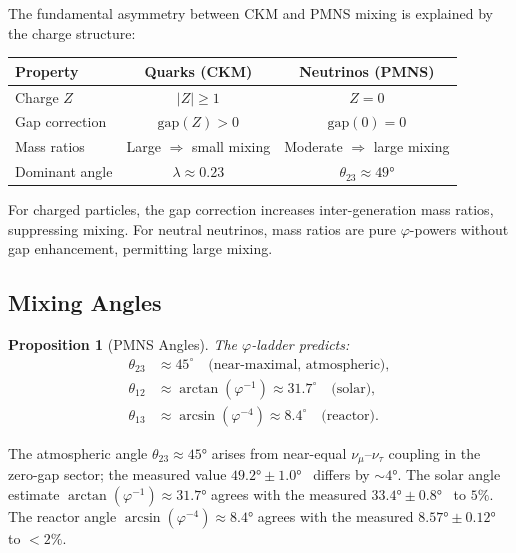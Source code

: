 \documentclass[12pt,a4paper]{article}
\newtheorem{proposition}[theorem]{Proposition}
\theoremstyle{definition}
\theoremstyle{remark}
\begin{document}
The fundamental asymmetry between CKM and PMNS mixing is explained by
the charge structure:

\begin{center}
\renewcommand{\arraystretch}{1.2}
\begin{tabular}{lcc}
\toprule
\textbf{Property} & \textbf{Quarks (CKM)} & \textbf{Neutrinos (PMNS)} \\
\midrule
Charge $Z$ & $|Z| \geq 1$ & $Z = 0$ \\
Gap correction & $\mathrm{gap}(Z) > 0$ & $\mathrm{gap}(0) = 0$ \\
Mass ratios & Large $\Rightarrow$ small mixing & Moderate $\Rightarrow$ large mixing \\
Dominant angle & $\lambda \approx 0.23$ & $\theta_{23} \approx 49°$ \\
\bottomrule
\end{tabular}
\end{center}

For charged particles, the gap correction increases inter-generation
mass ratios, suppressing mixing.  For neutral neutrinos, mass ratios
are pure $\varphi$-powers without gap enhancement, permitting large
mixing.

\subsection{Mixing Angles}

\begin{proposition}[PMNS Angles]
\label{prop:pmns-angles}
The $\varphi$-ladder predicts:
\begin{align}
  \theta_{23} &\approx 45^\circ \quad \text{(near-maximal, atmospheric)}, \\
  \theta_{12} &\approx \arctan(\varphi^{-1}) \approx 31.7^\circ
    \quad \text{(solar)}, \\
  \theta_{13} &\approx \arcsin(\varphi^{-4}) \approx 8.4^\circ
    \quad \text{(reactor)}.
\end{align}
\end{proposition}

The atmospheric angle $\theta_{23} \approx 45°$ arises from
near-equal $\nu_\mu$--$\nu_\tau$ coupling in the zero-gap sector;
the measured value $49.2° \pm 1.0°$~\cite{PDG2024} differs by $\sim 4°$.
The solar angle estimate $\arctan(\varphi^{-1}) \approx 31.7°$ agrees
with the measured $33.4° \pm 0.8°$~\cite{PDG2024} to $5\%$.  The reactor
angle $\arcsin(\varphi^{-4}) \approx 8.4°$ agrees with the measured
$8.57° \pm 0.12°$~\cite{PDG2024} to $<2\%$.
\end{document}

